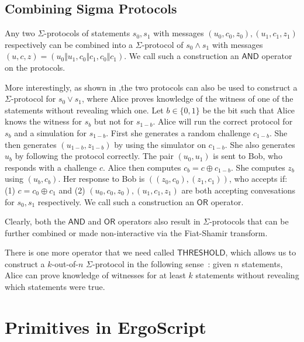 \documentclass[11pt]{article}
\newcommand{\authnote}[2]{\marginpar{\parbox{\marginparwidth}{\tiny %
  \textsf{#1 {\textcolor{blue}{notes: #2}}}}}%
  \textcolor{blue}{\textbf{\dag}}}
\newcommand{\authnote}[2]{
  \textsf{#1 \textcolor{blue}{: #2}}}
\newcommand{\authnote}[2]{}
\newcommand{\snote}[1]{{\authnote{\textcolor{yellow}{Scalahub notes}}{#1}}}
\newcommand{\andnode}{\ensuremath{\mathsf{AND}}}
\newcommand{\ornode}{\ensuremath{\mathsf{OR}}}
\newcommand{\tnode}{\ensuremath{\mathsf{THRESHOLD}}}
\begin{document}
\subsection{Combining Sigma Protocols}

Any two $\Sigma$-protocols of statements $s_0, s_1$ with messages $(u_0, c_0, z_0), (u_1, c_1, z_1)$ respectively can be combined into a $\Sigma$-protocol of $s_0 \land s_1$ with messages $(u, c, z) = (u_0\Vert u_1,c_0\Vert c_1, c_0\Vert c_1)$. We call such a construction an $\andnode$ operator on the protocols. %

More interestingly, as shown in \cite{orprotocol},the two protocols can also be used to construct a $\Sigma$-protocol for $s_0\lor s_1$, where Alice proves knowledge of the witness of one of the statements without revealing which one. Let $b\in \{0, 1\}$ be the bit such that Alice knows the witness for $s_b$ but not for $s_{1-b}$. Alice will run the correct protocol for $s_b$ and a simulation for $s_{1-b}$. First she generates a random challenge $c_{1-b}$. She then generates $(u_{1-b}, z_{1-b})$ by using the simulator on $c_{1-b}$. She also generates $u_b$ by following the protocol correctly. The pair $(u_0, u_1)$ is sent to Bob, who responds with a challenge $c$. Alice then computes $c_b = c\oplus c_{1-b}$. She computes $z_b$ using $(u_b, c_b)$. Her response to Bob is $((z_0, c_0), (z_1, c_1))$, who accepts if: (1) $c = c_0 \oplus c_1$ and (2) $(u_0, c_0, z_0), (u_1, c_1, z_1)$ are both accepting convesations for $s_0, s_1$ respectively. We call such a construction an $\ornode$ operator. 

Clearly, both the $\andnode$ and $\ornode$ operators also result in $\Sigma$-protocols that can be further combined or made non-interactive via the Fiat-Shamir transform. 

There is one more operator that we need called $\tnode$, which allows us to construct a $k$-out-of-$n$ $\Sigma$-protocol in the following sense~\cite{threshold}: given $n$ statements, Alice can prove knowledge of witnesses for at least $k$ statements without revealing which statements were true. 

\snote{Describe Threshold briefly}
\section{Primitives in ErgoScript}
\end{document}
